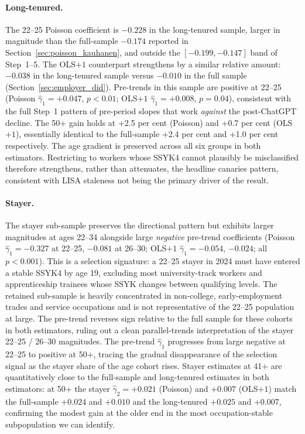 \documentclass[preprint,12pt,authoryear]{elsarticle}
\begin{document}
\paragraph{Long-tenured.} The 22--25 Poisson coefficient is $-0.228$ in the long-tenured sample, larger in magnitude than the full-sample $-0.174$ reported in Section~\ref{sec:poisson_kauhanen}, and outside the $[-0.199, -0.147]$ band of Step~1--5. The OLS$+1$ counterpart strengthens by a similar relative amount: $-0.038$ in the long-tenured sample versus $-0.010$ in the full sample (Section~\ref{sec:employer_did}). Pre-trends in this sample are positive at 22--25 (Poisson $\hat\gamma_1 = +0.047$, $p < 0.01$; OLS$+1$ $\hat\gamma_1 = +0.008$, $p = 0.04$), consistent with the full Step~1 pattern of pre-period slopes that work \emph{against} the post-ChatGPT decline. The 50+ gain holds at +2.5 per cent (Poisson) and +0.7 per cent (OLS$+1$), essentially identical to the full-sample +2.4 per cent and +1.0 per cent respectively. The age gradient is preserved across all six groups in both estimators. Restricting to workers whose SSYK4 cannot plausibly be misclassified therefore strengthens, rather than attenuates, the headline canaries pattern, consistent with LISA staleness not being the primary driver of the result.

\paragraph{Stayer.} The stayer sub-sample preserves the directional pattern but exhibits larger magnitudes at ages 22--34 alongside large \emph{negative} pre-trend coefficients (Poisson $\hat\gamma_1 = -0.327$ at 22--25, $-0.081$ at 26--30; OLS$+1$ $\hat\gamma_1 = -0.054$, $-0.024$; all $p < 0.001$). This is a selection signature: a 22--25 stayer in 2024 must have entered a stable SSYK4 by age 19, excluding most university-track workers and apprenticeship trainees whose SSYK changes between qualifying levels. The retained sub-sample is heavily concentrated in non-college, early-employment trades and service occupations and is not representative of the 22--25 population at large. The pre-trend reverses sign relative to the full sample for these cohorts in both estimators, ruling out a clean parallel-trends interpretation of the stayer 22--25 / 26--30 magnitudes. The pre-trend $\hat\gamma_1$ progresses from large negative at 22--25 to positive at 50+, tracing the gradual disappearance of the selection signal as the stayer share of the age cohort rises. Stayer estimates at 41+ are quantitatively close to the full-sample and long-tenured estimates in both estimators: at 50+ the stayer $\hat\gamma_2 = +0.021$ (Poisson) and $+0.007$ (OLS$+1$) match the full-sample $+0.024$ and $+0.010$ and the long-tenured $+0.025$ and $+0.007$, confirming the modest gain at the older end in the most occupation-stable subpopulation we can identify.
\end{document}
